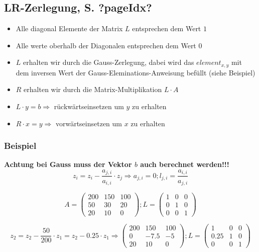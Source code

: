 \subsection{LR-Zerlegung, S. ?pageIdx?}

\begin{itemize}
\item Alle diagonal Elemente der Matrix $L$ entsprechen dem Wert $1$
\item Alle werte oberhalb der Diagonalen entsprechen dem Wert $0$ 
\item $L$ erhalten wir durch die Gauss-Zerlegung, dabei wird das $element_{x,y}$ mit dem inversen Wert der Gauss-Eleminations-Anweisung befüllt (siehe Beispiel)
\item $R$ erhalten wir durch die Matrix-Multiplikation $L\cdot A$
\item $L \cdot y = b \Rightarrow $ rückwärtseinsetzen um $y$ zu erhalten
\item $R \cdot x = y \Rightarrow $ vorwärtseinsetzen um $x$ zu erhalten
\end{itemize}

\subsubsection{Beispiel}
\textbf{Achtung bei Gauss muss der Vektor $b$ auch berechnet werden!!!}
\[ z_i = z_i - \frac{a_{j,i}}{a_{i,i}} \cdot z_j \Rightarrow a_{j,i}=0; l_{j,i}=\frac{a_{i,i}}{a_{j,i}}\]


\[ A= \left( \begin{array}{ccc}
200 & 150 & 100\\
50 & 30 & 20\\
20 & 10 & 0 \end{array}\right); L= \left( \begin{array}{ccc}
1 & 0 & 0\\
0 & 1 & 0\\
0 & 0 & 1\end{array} \right) \]

\[ z_2 = z_2 - \frac{50}{200} \cdot z_1 = z_2 - 0.25 \cdot z_1 \Rightarrow \left( \begin{array}{ccc}
200 & 150 & 100\\
0 & -7.5 & -5\\
20 & 10 & 0 \end{array}\right); L= \left( \begin{array}{ccc}
1 & 0 & 0\\
0.25 & 1 & 0\\
0 & 0 & 1\end{array} \right) \]

